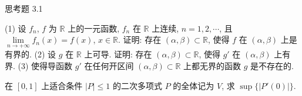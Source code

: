 \begin{exblock}{思考题 3.1}
  \item (1) 设 $f_n$, $f$ 为 $\mathbb{R}$ 上的一元函数, $f_n$ 在 $\mathbb{R}$ 上连续, $n = 1, 2, \cdots$, 且 $\lim\limits_{n\to+\infty}f_n(x) = f(x)$, $x \in \mathbb{R}$. 证明: 存在 $(\alpha,\beta) \subset \mathbb{R}$, 使得 $f$ 在 $(\alpha,\beta)$ 上是有界的.
  (2) 设 $g$ 在 $\mathbb{R}$ 上可导. 证明: 存在 $(\alpha,\beta) \subset \mathbb{R}$, 使得 $g'$ 在 $(\alpha,\beta)$ 上有界.
  (3) 使得导函数 $g'$ 在任何开区间 $(\alpha,\beta) \subset \mathbb{R}$ 上都无界的函数 $g$ 是不存在的.

  \item 在 $[0,1]$ 上适合条件 $|P| \leqslant 1$ 的二次多项式 $P$ 的全体记为 $V$, 求 $\sup\{|P'(0)|\}$.
\end{exblock}
